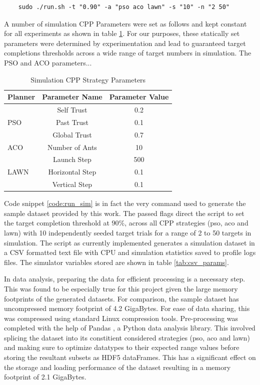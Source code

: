 \documentclass{report}
\newenvironment{code}{\captionsetup{type=listing}}{}
\begin{document}
\begin{code}
\begin{verbatim}
	sudo ./run.sh -t "0.90" -a "pso aco lawn" -s "10" -n "2 50"
\end{verbatim}
\label{code:run_sim}
\end{code}
\vspace{1cm}

A number of simulation CPP Parameters were set as follows and kept constant for all experiments as shown in table \ref{tab:sim_cpp_params}. For our purposes, these statically set parameters were determined by experimentation and lead to guaranteed target completions thresholds across a wide range of target numbers in simulation. The PSO and ACO parameters...

\bgroup
\def\arraystretch{1.5}%
\begin{table}[h]
  \centering
  \begin{tabular}{|l|c|c|}
  \hline
  \textbf{Planner} & \textbf{Parameter Name} & \textbf{Parameter Value} \\
  \hline
  \multirow{3}{*}{PSO} & Self Trust & 0.2 \\
	& Past Trust & 0.1 \\
	& Global Trust & 0.7 \\
  \hline
  ACO & Number of Ants & 10 \\
  \hline
  \multirow{3}{*}{LAWN} & Launch Step & 500 \\
	& Horizontal Step & 0.1 \\
	& Vertical Step & 0.1 \\
  \hline
  \end{tabular}
  \caption{Simulation CPP Strategy Parameters}
  \label{tab:sim_cpp_params}
\end{table}
\egroup

Code snippet \ref{code:run_sim} is in fact the very command used to generate the sample dataset provided by this work. The passed flags direct the script to set the target completion threshold at $90\%$, across all CPP strategies (pso, aco and lawn) with 10 independently seeded target trials for a range of 2 to 50 targets in simulation. The script as currently implemented generates a simulation dataset in a CSV formatted text file with CPU and simulation statistics saved to profile logs files. The simulator variables stored are shown in table \ref{tab:csv_params}.

In data analysis, preparing the data for efficient processing is a necessary step. This was found to be especially true for this project given the large memory footprints of the generated datasets. For comparison, the sample dataset has uncompressed memory footprint of 4.2 GigaBytes. For ease of data sharing, this was compressed using standard Linux compression tools. Pre-processing was completed with the help of Pandas \cite{Pandas}, a Python data analysis library. This involved splicing the dataset into its constitient considered strategies (pso, aco and lawn) and making sure to optimize datatypes to their expected range values before storing the resultant subsets as HDF5 dataFrames. This has a significant effect on the storage and loading performance of the dataset resulting in a memory footprint of 2.1 GigaBytes.
\end{document}
